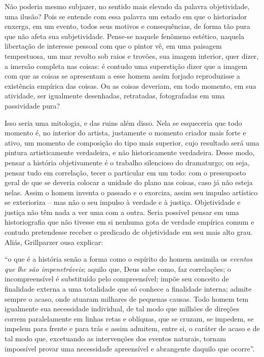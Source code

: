 Não poderia mesmo subjazer, no sentido mais elevado da palavra
objetividade, uma ilusão? Pois se entende com essa palavra um estado em
que o historiador enxerga, em um evento, todos seus motivos e
consequências, de forma tão pura que não afeta sua subjetividade.
Pense-se naquele fenômeno estético, naquela libertação de interesse
pessoal com que o pintor vê, em uma paisagem tempestuosa, um mar revolto
sob raios e trovões, sua imagem interior, quer dizer, a imersão completa
nas coisas: é contudo uma superstição dizer que a imagem com que as
coisas se apresentam a esse homem assim forjado reproduzisse a
existência empírica das coisas. Ou as coisas deveriam, em todo momento,
em sua atividade, ser igualmente desenhadas, retratadas, fotografadas em
uma passividade pura?

Isso seria uma mitologia, e das ruins além disso. Nela se esqueceria que
todo momento é, no interior do artista, justamente o momento criador
mais forte e ativo, um momento de composição do tipo mais superior, cujo
resultado será uma pintura artisticamente verdadeira, e não
historicamente verdadeira. Desse modo, pensar a história objetivamente é
o trabalho silencioso do dramaturgo; ou seja, pensar tudo em correlação,
tecer o particular em um todo: com o pressuposto geral de que se deveria
colocar a unidade do plano nas coisas, caso já não esteja nelas. Assim o
homem inventa o passado e o exorciza, assim seu impulso artístico se
exterioriza -- mas não o seu impulso à verdade e à justiça. Objetividade
e justiça não têm nada a ver uma com a outra. Seria possível pensar em
uma historiografia que não tivesse em si nenhuma gota de verdade
empírica comum e contudo pretendesse receber o predicado de objetividade
em seu mais alto grau. Aliás, Grillparzer ousa explicar:

``o que é a história senão a forma como o espírito do homem assimila os
\emph{eventos que lhe são impenetráveis}; aquilo que, Deus sabe como,
faz correlações; o incompreensível é substituído pelo compreensível;
impõe seu conceito de finalidade externa a uma totalidade que só conhece
a finalidade interna; admite sempre o acaso, onde atuaram milhares de
pequenas causas. Todo homem tem igualmente sua necessidade individual,
de tal modo que milhões de direções correm paralelamente em linhas retas
e oblíquas, que se cruzam, se impedem, se impelem para frente e para
trás e assim admitem, entre si, o caráter de acaso e de tal modo que,
excetuando as intervenções dos eventos naturais, tornam impossível
provar uma necessidade apreensível e abrangente daquilo que ocorre''.

